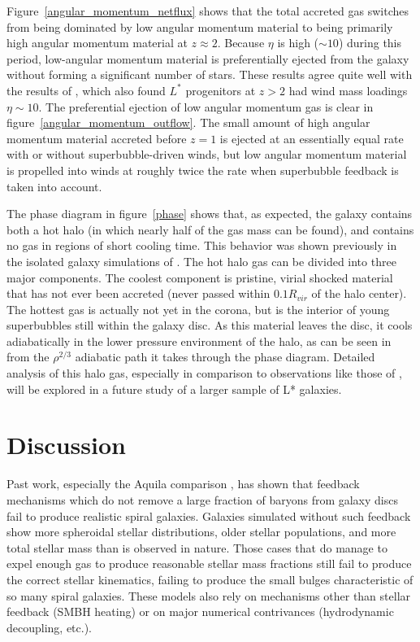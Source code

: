 Figure~\ref{angular_momentum_netflux} shows that the total accreted gas switches
from being dominated by low angular momentum material to being primarily high
angular momentum material at $z\approx2$.  Because $\eta$ is high ($\sim 10$)
during this period, low-angular momentum material is preferentially ejected from
the galaxy without forming a significant number of stars.  These results agree
quite well with the results of \citet{Muratov2015}, which also found $L^*$
progenitors at $z>2$ had wind mass loadings $\eta\sim 10$. The preferential
ejection of low angular momentum gas is clear in
figure~\ref{angular_momentum_outflow}.  The small amount of high angular
momentum material accreted before $z=1$ is ejected at an essentially equal rate
with or without superbubble-driven winds, but low angular momentum material is
propelled into winds at roughly twice the rate when superbubble feedback is
taken into account.

The phase diagram in figure~\ref{phase} shows that, as expected, the galaxy
contains both a hot halo (in which nearly half of the gas mass can be found),
and contains no gas in regions of short cooling time.  This behavior was shown
previously in the isolated galaxy simulations of \citet{Keller2014}.  The hot
halo gas can be divided into three major components. The coolest component is
pristine, virial shocked material that has not ever been accreted (never passed
within $0.1R_{vir}$ of the halo center).  The hottest gas is actually not yet in
the corona, but is the interior of young superbubbles still within the galaxy
disc.  As this material leaves the disc, it cools adiabatically in the lower
pressure environment of the halo, as can be seen in from the $\rho^{2/3}$
adiabatic path it takes through the phase diagram.  Detailed analysis of this
halo gas, especially in comparison to observations like those of
\citet{Steidel2010}, will be explored in a future study of a larger sample of
L* galaxies.

\section{Discussion}

Past work, especially the Aquila comparison \citep{Scannapieco2012}, has shown
that feedback mechanisms which do not remove a large fraction of baryons from
galaxy discs fail to produce realistic spiral galaxies.  Galaxies simulated
without such feedback show more spheroidal stellar
distributions, older stellar populations, and more total stellar mass than is
observed in nature.  Those cases that do manage to expel enough gas to produce
reasonable stellar mass fractions still fail to produce the correct stellar
kinematics, failing to produce the small bulges characteristic of
so many spiral galaxies.  These models also rely on mechanisms other than
stellar feedback (SMBH heating) or on major numerical contrivances (hydrodynamic
decoupling, etc.).  

